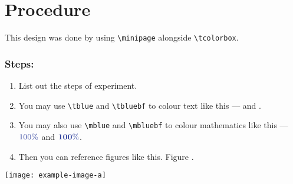 \section{Procedure}
This design was done by using \verb|\minipage| alongside \verb|\tcolorbox|.

\medskip

\noindent\begin{minipage}{0.45\textwidth}
\begin{leftbox}
    \subsubsection*{Steps:}
    \begin{enumerate}
        \item List out the steps of experiment.
        \item You may use \verb|\tblue| and \verb|\tbluebf| to colour text like this —  and .
        \item You may also use \verb|\mblue| and \verb|\mbluebf| to colour mathematics like this — $\mblue{100\%}$ and $\mbluebf{100\%}$.
        \item Then you can reference figures like this. Figure \tbluebf{\ref{fig:4.1}}.
    \end{enumerate} 
\end{leftbox}
\end{minipage} 
\hspace{.05\textwidth}
\begin{minipage}{.45\textwidth}
    \centering
    \texttt{[image: example-image-a]}
    \label{fig:4.1}
\end{minipage}

